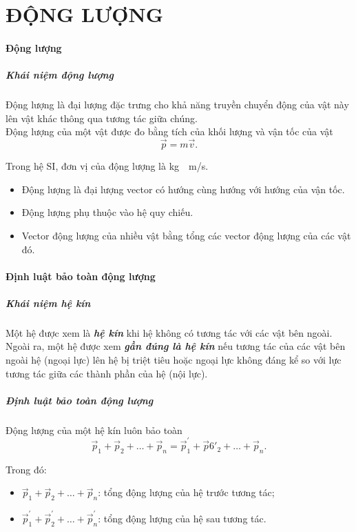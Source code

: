 \chapter{ĐỘNG LƯỢNG}
\begin{tomtat}
	\subsubsection{Động lượng}
	\paragraph{Khái niệm động lượng}
	\begin{dn}
		Động lượng là đại lượng đặc trưng cho khả năng truyền chuyển động của vật này lên vật khác thông qua tương tác giữa chúng.\\
		Động lượng của một vật được đo bằng tích của khối lượng và vận tốc của vật
		$$\vec{p}=m\vec{v}.$$
	\end{dn}
	Trong hệ SI, đơn vị của động lượng là \si{\kilogram\cdot\meter/\second}.
	\begin{note}
		\begin{itemize}
			\item Động lượng là đại lượng vector có hướng cùng hướng với hướng của vận tốc.
			\item Động lượng phụ thuộc vào hệ quy chiếu.
			\item Vector động lượng của nhiều vật bằng tổng các vector động lượng của các vật đó.
		\end{itemize}
	\end{note}
	\subsubsection{Định luật bảo toàn động lượng}
	\paragraph{Khái niệm hệ kín}
	\begin{dn}
		Một hệ được xem là \textbf{\textit{hệ kín}} khi hệ không có tương tác với các vật bên ngoài.\\
		Ngoài ra, một hệ được xem \textbf{\textit{gần đúng là hệ kín  }} nếu tương tác của các vật bên ngoài hệ (ngoại lực) lên hệ bị triệt tiêu hoặc ngoại lực không đáng kể so với lực tương tác giữa các thành phần của hệ (nội lực).
		
	\end{dn}
	\paragraph{Định luật bảo toàn động lượng}
	\begin{dl}
		Động lượng của một hệ kín luôn bảo toàn
		$$\vec{p}_1+\vec{p}_2+\dots+\vec{p}_n=\vec{p}^\prime_1+\vec{p}6\prime_2+\dots+\vec{p}_n.$$
	\end{dl}
	Trong đó:
	\begin{itemize}
		\item $\vec{p}_1+\vec{p}_2+\dots+\vec{p}_n$: tổng động lượng của hệ trước tương tác;
		\item $\vec{p}^\prime_1+\vec{p}^\prime_2+\dots+\vec{p}^\prime_n$: tổng động lượng của hệ sau tương tác.
	\end{itemize}

\end{tomtat}
